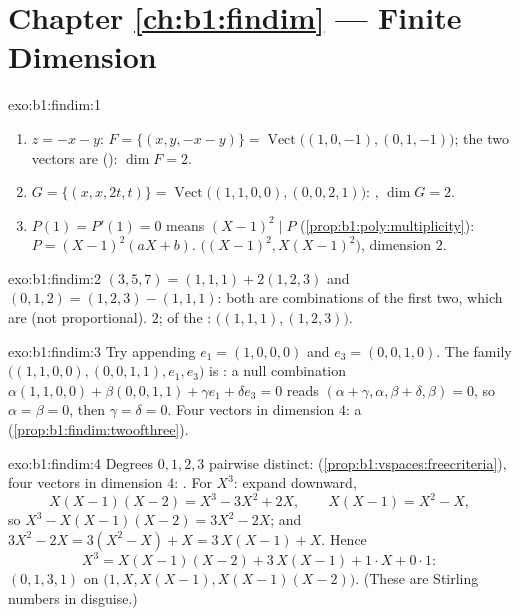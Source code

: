 \section*{Chapter \ref{ch:b1:findim} --- Finite Dimension}

\begin{solution}{exo:b1:findim:1}
\begin{enumerate}
  \item $z = -x - y$: $F = \{(x, y, -x-y)\} =
        \operatorname{Vect}\bigl((1,0,-1), (0,1,-1)\bigr)$; the two
        vectors are  (): $\dim F = 2$.
  \item $G = \{(x, x, 2t, t)\} =
        \operatorname{Vect}\bigl((1,1,0,0), (0,0,2,1)\bigr)$: ,
        $\dim G = 2$.
  \item $P(1) = P'(1) = 0$ means $(X-1)^2 \mid P$
        (\cref{prop:b1:poly:multiplicity}): $P = (X-1)^2(aX + b)$.
         $\bigl((X-1)^2, X(X-1)^2\bigr)$, dimension $2$.
\end{enumerate}
\end{solution}

\begin{solution}{exo:b1:findim:2}
$(3,5,7) = (1,1,1) + 2(1,2,3)$ and $(0,1,2) = (1,2,3) - (1,1,1)$:
both are combinations of the first two, which are  (not
proportional).  $2$;  of the :
$\bigl((1,1,1), (1,2,3)\bigr)$.
\end{solution}

\begin{solution}{exo:b1:findim:3}
Try appending $e_1 = (1,0,0,0)$ and $e_3 = (0,0,1,0)$. The family
$\bigl((1,1,0,0), (0,0,1,1), e_1, e_3\bigr)$ is : a null
combination $\alpha(1,1,0,0) + \beta(0,0,1,1) + \gamma e_1 + \delta
e_3 = 0$ reads $(\alpha + \gamma, \alpha, \beta + \delta, \beta) =
0$, so $\alpha = \beta = 0$, then $\gamma = \delta = 0$. Four 
vectors in dimension $4$: a 
(\cref{prop:b1:findim:twoofthree}).
\end{solution}

\begin{solution}{exo:b1:findim:4}
Degrees $0, 1, 2, 3$ pairwise distinct: 
(\cref{prop:b1:vspaces:freecriteria}), four vectors in dimension
$4$: . For $X^3$: expand downward,
\[
X(X-1)(X-2) = X^3 - 3X^2 + 2X,
\qquad
X(X-1) = X^2 - X,
\]
so $X^3 - X(X-1)(X-2) = 3X^2 - 2X$; and $3X^2 - 2X = 3(X^2 - X) + X
= 3\,X(X-1) + X$. Hence
\[
X^3 = X(X-1)(X-2) + 3\,X(X-1) + 1\cdot X + 0\cdot 1 :
\]
 $(0, 1, 3, 1)$ on $\bigl(1, X, X(X-1),
X(X-1)(X-2)\bigr)$. (These are Stirling numbers in disguise.)
\end{solution}

